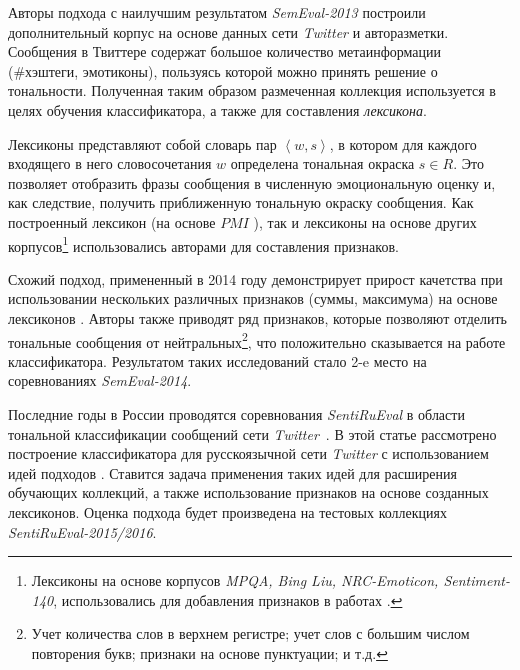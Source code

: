     Авторы подхода с наилучшим результатом {\it SemEval-2013} \cite{tonalityAnalysis}
    построили дополнительный корпус на основе данных сети {\it Twitter} и
    авторазметки.
    Сообщения в Твиттере содержат большое количество метаинформации (\#хэштеги,
    эмотиконы), пользуясь которой можно принять решение о тональности.
    Полученная таким образом размеченная коллекция используется в целях
    обучения классификатора, а также для составления {\it лексикона}.

    Лексиконы представляют собой словарь пар $\left<w, s\right>$, в котором для каждого
    входящего в него словосочетания $w$ определена тональная окраска $s \in R$.
    Это позволяет отобразить фразы сообщения в численную эмоциональную оценку и,
    как следствие, получить приближенную тональную окраску сообщения.
    Как построенный лексикон (на основе $PMI$ \cite{lexiconSO}), так и лексиконы
    на основе других корпусов\footnote{
        Лексиконы на основе корпусов {\it MPQA, Bing Liu, NRC-Emoticon, Sentiment-140},
        использовались для добавления признаков в работах
        \cite{tonalityAnalysis,modernApproach}.
    }
    использовались авторами \cite{tonalityAnalysis} для составления признаков.

    Схожий подход, примененный в 2014 году демонстрирует прирост качетства при
    использовании нескольких различных признаков (суммы, максимума) на основе
    лексиконов \cite{modernApproach}.
    Авторы также приводят ряд признаков, которые позволяют отделить тональные
    сообщения от нейтральных\footnote{
        Учет количества слов в верхнем регистре;
        учет слов с большим числом повторения букв;
        признаки на основе пунктуации;
        и т.д.
    }, что положительно сказывается на работе классификатора.
    Результатом таких исследований стало 2-e место на соревнованиях {\it SemEval-2014}.

    Последние годы в России проводятся соревнования {\it SentiRuEval} в области
    тональной классификации сообщений сети {\it Twitter}~\cite{dialog2015,dialog2016}.
    В этой статье рассмотрено построение классификатора для русскоязычной сети
    {\it Twitter} с использованием идей подходов \cite{tonalityAnalysis, modernApproach}.
    Ставится задача применения таких идей для расширения обучающих коллекций,
    а также использование признаков на основе созданных лексиконов.
    Оценка подхода будет произведена на тестовых коллекциях
    {\it SentiRuEval-2015/2016}.
